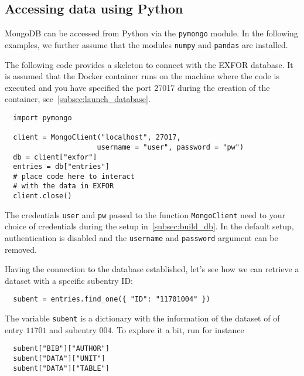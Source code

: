 \documentclass[12pt,a4paper]{scrartcl}
\begin{document}
 \subsection{Accessing data using Python}
 MongoDB can be accessed from Python via the \verb|pymongo| module.
 In the following examples, we further assume that the modules \verb|numpy| and \verb|pandas| are installed.

 The following code provides a skeleton to connect with the EXFOR database.
 It is assumed that the Docker container runs on the machine where the code is executed and you have specified the port 27017 during the creation of the container, see~\cref{subsec:launch_database}.

\begin{verbatim}
  import pymongo
 
  client = MongoClient("localhost", 27017,
                      username = "user", password = "pw")                      
  db = client["exfor"]
  entries = db["entries"] 
  # place code here to interact
  # with the data in EXFOR 
  client.close()
\end{verbatim}
The credentials \verb|user| and \verb|pw| passed to the function \verb|MongoClient| need to your choice of credentials during the setup in~\cref{subsec:build_db}.
In the default setup, authentication is disabled and the \verb|username| and \verb|password| argument can be removed.

Having the connection to the database established, let's see how we can retrieve a dataset with a specific subentry ID:
\begin{verbatim}
  subent = entries.find_one({ "ID": "11701004" })
\end{verbatim}
The variable \verb|subent| is a dictionary with the information of the dataset of of entry $11701$ and subentry $004$.
To explore it a bit, run for instance
\begin{verbatim}
  subent["BIB"]["AUTHOR"]
  subent["DATA"]["UNIT"]
  subent["DATA"]["TABLE"]
\end{verbatim}
\end{document}
